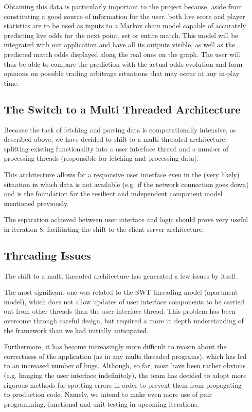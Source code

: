 \documentclass[10pt]{report}
\begin{document}
Obtaining this data is particularly important to the project because, aside from constituting a good source of information for the user, both live score and player statistics are to be used as inputs to a Markov chain model capable of accurately predicting live odds for the next point, set or entire match. This model will be integrated with our application and have all its outputs visible, as well as the predicted match odds displayed along the real ones on the graph. The user will thus be able to compare the prediction with the actual odds evolution and form opinions on possible trading arbitrage situations that may occur at any in-play time.

\subsection{The Switch to a Multi Threaded Architecture}
Because the task of fetching and parsing data is computationally intensive, as described above, we have decided to shift to a multi threaded architecture, splitting existing functionality into a user interface thread and a number of processing threads (responsible for fetching and processing data).

This architecture allows for a responsive user interface even in the (very likely) situation in which data is not available (e.g. if the network connection goes down) and is the foundation for the resilient and independent component model mentioned previously.

The separation achieved between user interface and logic should prove very  useful in iteration 8, facilitating the shift to the client server architecture.

\subsection{Threading Issues}

The shift to a multi threaded architecture has generated a few issues by itself.

The most significant one was related to the SWT threading model (apartment model), which does not allow updates of user interface components to be carried out from other threads than the user interface thread. This problem has been overcome through careful design, but required a more in depth understanding of the framework than we had initially anticipated.

Furthermore, it has become increasingly more difficult to reason about the correctness of the application (as in any multi threaded programs), which has led to an increased number of bugs. Although, so far, most have been rather obvious (e.g. hanging the user interface indefinitely), the team has decided to adopt more rigorous methods for spotting errors in order to prevent them from propagating to production code.
Namely, we intend to make even more use of pair programming, functional and unit testing in upcoming iterations.
\end{document}
